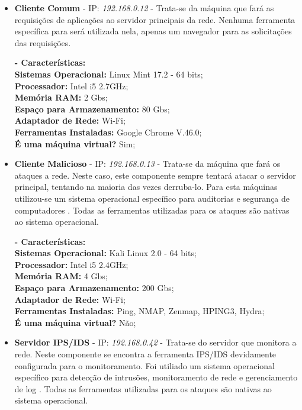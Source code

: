 		\begin{itemize}
			\item \textbf{Cliente Comum} - IP: \emph{192.168.0.12} - Trata-se da máquina que fará as requisições de aplicações ao servidor principais da rede. Nenhuma ferramenta específica para será utilizada nela, apenas um navegador para as solicitações das requisições. 

			\textbf{- Características:} \\
			\textbf{Sistemas Operacional:} Linux Mint 17.2 - 64 bits; \\
			\textbf{Processador:} Intel i5 2.7GHz; \\
			\textbf{Memória RAM:} 2 Gbs; \\
			\textbf{Espaço para Armazenamento:} 80 Gbs; \\
			\textbf{Adaptador de Rede:} Wi-Fi; \\
			\textbf{Ferramentas Instaladas:} Google Chrome V.46.0; \\
			\textbf{É uma máquina virtual?} Sim; \\
	
			\item \textbf{Cliente Malicioso} - IP: \emph{192.168.0.13} - Trata-se da máquina que fará os ataques a rede. Neste caso, este componente sempre tentará atacar o servidor principal, tentando na maioria das vezes derruba-lo. Para esta máquinas utilizou-se um sistema operacional específico para auditorias e segurança de computadores \cite{kali}. Todas as ferramentas utilizadas para os ataques são nativas ao sistema operacional.

			\textbf{- Características:} \\
			\textbf{Sistemas Operacional:} Kali Linux 2.0 - 64 bits; \\
			\textbf{Processador:} Intel i5 2.4GHz; \\
			\textbf{Memória RAM:} 4 Gbs; \\
			\textbf{Espaço para Armazenamento:} 200 Gbs; \\
			\textbf{Adaptador de Rede:} Wi-Fi; \\
			\textbf{Ferramentas Instaladas:} Ping, NMAP, Zenmap, HPING3, Hydra; \\
			\textbf{É uma máquina virtual?} Não; \\

			\item \textbf{Servidor IPS/IDS} - IP: \emph{192.168.0.42} - Trata-se do servidor que monitora a rede. Neste componente se encontra a ferramenta IPS/IDS devidamente configurada para o monitoramento. Foi utiliado um sistema operacional específico para detecção de intrusões, monitoramento de rede e gerenciamento de log \cite{SO}. Todas as ferramentas utilizadas para os ataques são nativas ao sistema operacional.


\end{itemize}
